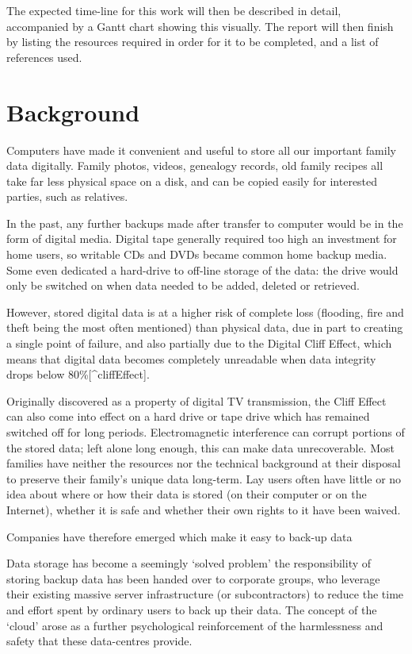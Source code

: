 \documentclass[12pt,a4paper,]{adreport}
\begin{document}
The expected time-line for this work will then be described in detail,
accompanied by a Gantt chart showing this visually. The report will then
finish by listing the resources required in order for it to be
completed, and a list of references used.

\chapter{Background}\label{background}

Computers have made it convenient and useful to store all our important
family data digitally. Family photos, videos, genealogy records, old
family recipes all take far less physical space on a disk, and can be
copied easily for interested parties, such as relatives.

In the past, any further backups made after transfer to computer would
be in the form of digital media. Digital tape generally required too
high an investment for home users, so writable CDs and DVDs became
common home backup media. Some even dedicated a hard-drive to off-line
storage of the data: the drive would only be switched on when data
needed to be added, deleted or retrieved.

However, stored digital data is at a higher risk of complete loss
(flooding, fire and theft being the most often mentioned) than physical
data, due in part to creating a single point of failure, and also
partially due to the Digital Cliff Effect, which means that digital data
becomes completely unreadable when data integrity drops below
80\%{[}\^{}cliffEffect{]}.

Originally discovered as a property of digital TV transmission, the
Cliff Effect can also come into effect on a hard drive or tape drive
which has remained switched off for long periods. Electromagnetic
interference can corrupt portions of the stored data; left alone long
enough, this can make data unrecoverable. Most families have neither the
resources nor the technical background at their disposal to preserve
their family's unique data long-term. Lay users often have little or no
idea about where or how their data is stored (on their computer or on
the Internet), whether it is safe and whether their own rights to it
have been waived.

Companies have therefore emerged which make it easy to back-up data

Data storage has become a seemingly `solved problem' the responsibility
of storing backup data has been handed over to corporate groups, who
leverage their existing massive server infrastructure (or
subcontractors) to reduce the time and effort spent by ordinary users to
back up their data. The concept of the `cloud' arose as a further
psychological reinforcement of the harmlessness and safety that these
data-centres provide.
\end{document}
